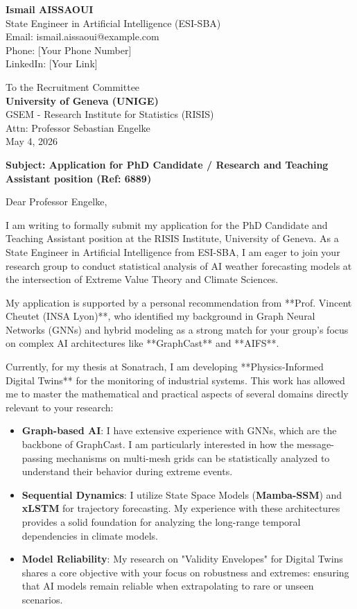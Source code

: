 \documentclass[11pt,a4paper]{article}
\begin{document}
\noindent \textbf{Ismail AISSAOUI} \\
State Engineer in Artificial Intelligence (ESI-SBA) \\
Email: ismail.aissaoui@example.com \\
Phone: [Your Phone Number] \\
LinkedIn: [Your Link]

\bigskip

\begin{flushright}
    To the Recruitment Committee \\
    \textbf{University of Geneva (UNIGE)} \\
    GSEM - Research Institute for Statistics (RISIS) \\
    Attn: Professor Sebastian Engelke \\
    \medskip
    May 4, 2026
\end{flushright}

\bigskip

\noindent \textbf{Subject: Application for PhD Candidate / Research and Teaching Assistant position (Ref: 6889)}

\bigskip

Dear Professor Engelke,

I am writing to formally submit my application for the PhD Candidate and Teaching Assistant position at the RISIS Institute, University of Geneva. As a State Engineer in Artificial Intelligence from ESI-SBA, I am eager to join your research group to conduct statistical analysis of AI weather forecasting models at the intersection of Extreme Value Theory and Climate Sciences.

My application is supported by a personal recommendation from **Prof. Vincent Cheutet (INSA Lyon)**, who identified my background in Graph Neural Networks (GNNs) and hybrid modeling as a strong match for your group's focus on complex AI architectures like **GraphCast** and **AIFS**.

Currently, for my thesis at Sonatrach, I am developing **Physics-Informed Digital Twins** for the monitoring of industrial systems. This work has allowed me to master the mathematical and practical aspects of several domains directly relevant to your research:
\begin{itemize}
    \item \textbf{Graph-based AI}: I have extensive experience with GNNs, which are the backbone of GraphCast. I am particularly interested in how the message-passing mechanisms on multi-mesh grids can be statistically analyzed to understand their behavior during extreme events.
    \item \textbf{Sequential Dynamics}: I utilize State Space Models (\textbf{Mamba-SSM}) and \textbf{xLSTM} for trajectory forecasting. My experience with these architectures provides a solid foundation for analyzing the long-range temporal dependencies in climate models.
    \item \textbf{Model Reliability}: My research on "Validity Envelopes" for Digital Twins shares a core objective with your focus on robustness and extremes: ensuring that AI models remain reliable when extrapolating to rare or unseen scenarios.
\end{itemize}
\end{document}
